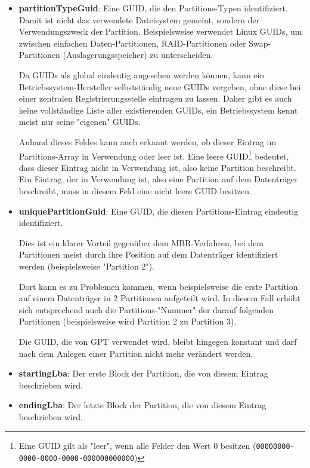 \begin{itemize}
    \item \textbf{partitionTypeGuid}:
    Eine GUID, die den Partitions-Typen identifiziert.
    Damit ist nicht das verwendete Dateisystem gemeint, sondern der Verwendungszweck der Partition.
    Beispielsweise verwendet Linux GUIDs, um zwischen einfachen Daten-Partitionen, RAID-Partitionen oder Swap-Partitionen (Auslagerungsspeicher) zu unterscheiden.
    
    Da GUIDs als global eindeutig angesehen werden können, kann ein Betriebssystem-Hersteller selbstständig neue GUIDs vergeben, ohne diese bei einer zentralen Registrierungsstelle eintragen zu lassen.
    Daher gibt es auch keine vollständige Liste aller existierenden GUIDs, ein Betriebssystem kennt meist nur seine "eigenen" GUIDs.

    \newpage
    Anhand dieses Feldes kann auch erkannt werden, ob dieser Eintrag im Partitions-Array in Verwendung oder leer ist.
    Eine leere GUID\footnote{
        Eine GUID gilt als "leer", wenn alle Felder den Wert 0 besitzen (\texttt{00000000-0000-0000-0000-000000000000})
    } bedeutet, dass dieser Eintrag nicht in Verwendung ist, also keine Partition beschreibt.
    Ein Eintrag, der in Verwendung ist, also eine Partition auf dem Datenträger beschreibt, muss in diesem Feld eine nicht leere GUID besitzen.

    \item \textbf{uniquePartitionGuid}:
    Eine GUID, die diesen Partitions-Eintrag eindeutig identifiziert.
    
    Dies ist ein klarer Vorteil gegenüber dem MBR-Verfahren, bei dem Partitionen meist durch ihre Position auf dem Datenträger identifiziert werden (beispielsweise "Partition 2").
    
    Dort kann es zu Problemen kommen, wenn beispielsweise die erste Partition auf einem Datenträger in 2 Partitionen aufgeteilt wird.
    In diesem Fall erhöht sich entsprechend auch die Partitions-"Nummer" der darauf folgenden Partitionen (beispielsweise wird Partition 2 zu Partition 3).
    
    Die GUID, die von GPT verwendet wird, bleibt hingegen konstant und darf nach dem Anlegen einer Partition nicht mehr verändert werden.

    \item \textbf{startingLba}:
    Der erste Block der Partition, die von diesem Eintrag beschrieben wird.

    \item \textbf{endingLba}:
    Der letzte Block der Partition, die von diesem Eintrag beschrieben wird.


\end{itemize}
